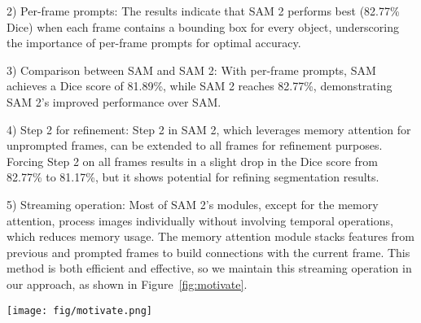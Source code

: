 2) Per-frame prompts: The results indicate that SAM 2 performs best (82.77\% Dice) when each frame contains a bounding box for every object, underscoring the importance of per-frame prompts for optimal accuracy.

3) Comparison between SAM and SAM 2: With per-frame prompts, SAM achieves a Dice score of 81.89\%, while SAM 2 reaches 82.77\%, demonstrating SAM 2's improved performance over SAM.

4) Step 2 for refinement: Step 2 in SAM 2, which leverages memory attention for unprompted frames, can be extended to all frames for refinement purposes. Forcing Step 2 on all frames results in a slight drop in the Dice score from 82.77\% to 81.17\%, but it shows potential for refining segmentation results. 

5) Streaming operation: Most of SAM 2's modules, except for the memory attention, process images individually without involving temporal operations, which reduces memory usage. The memory attention module stacks features from previous and prompted frames to build connections with the current frame. This method is both efficient and effective, so we maintain this streaming operation in our approach, as shown in Figure~\ref{fig:motivate}.


\begin{figure*}[!t]
\centering
 \vspace{-0.6cm}
\texttt{[image: fig/motivate.png]}
      \caption{(1) Performance comparisons based on proposed methods. (2) Ablation studies for frame selection strategies. (3) Proposed Adapters. (4) Ablation studies for prompt generators.}
\vspace{-0.4cm}
\label{fig:motivate}
\end{figure*}






